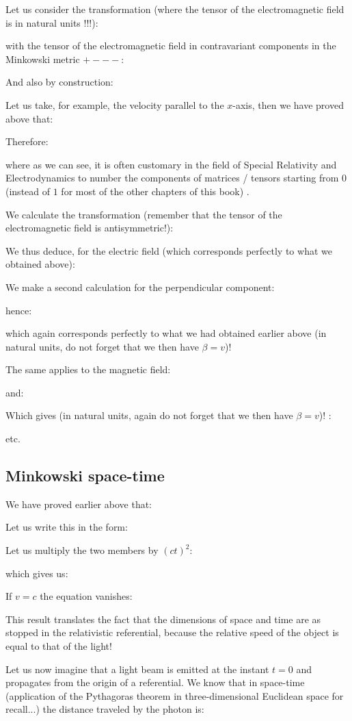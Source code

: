 	Let us consider the transformation (where the tensor of the electromagnetic field is in natural units !!!):
	
	with the tensor of the electromagnetic field in contravariant components in the Minkowski metric $+---$:
	
	And also by construction:
	
	Let us take, for example, the velocity parallel to the $x$-axis, then we have proved above that:
	
	Therefore:
	
	where as we can see, it is often customary in the field of Special Relativity and Electrodynamics to number the components of matrices / tensors starting from $0$ (instead of $1$ for most of the other chapters of this book) .

	We calculate the transformation (remember that the tensor of the electromagnetic field is antisymmetric!):
	
	We thus deduce, for the electric field (which corresponds perfectly to what we obtained above):
	
	We make a second calculation for the perpendicular component:
	
	hence:
	
	which again corresponds perfectly to what we had obtained earlier above (in natural units, do not forget that we then have $\beta=v$)!

	The same applies to the magnetic field:
	
	and:
	
	Which gives (in natural units, again do not forget that we then have $\beta=v$)! :
	
	etc.
	
	\subsection{Minkowski space-time}
		We have proved earlier above that:
	
	Let us write this in the form:
	
	Let us multiply the two members by $(ct)^2$:
	
	which gives us:
	
	If $v=c$ the equation vanishes:
	
	This result translates the fact that the dimensions of space and time are as stopped in the relativistic referential, because the relative speed of the object is equal to that of the light!

	Let us now imagine that a light beam is emitted at the instant $t=0$ and propagates from the origin of a referential. We know that in space-time (application of the Pythagoras theorem in three-dimensional Euclidean space for recall...) the distance traveled by the photon is:
	
